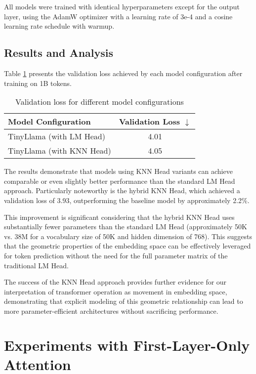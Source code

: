 All models were trained with identical hyperparameters except for the output layer, using the AdamW optimizer with a learning rate of 3e-4 and a cosine learning rate schedule with warmup.

\subsection{Results and Analysis}

Table \ref{tab:knn_head_results} presents the validation loss achieved by each model configuration after training on 1B tokens.

\begin{table}[h]
    \centering
    \caption{Validation loss for different model configurations}
    \begin{tabular}{lc}
    \toprule
    Model Configuration & Validation Loss $\downarrow$ \\
    \midrule
    TinyLlama (with LM Head) & 4.01 \\
    TinyLlama (with KNN Head) & 4.05 \\
    \bottomrule
    \end{tabular}
    \label{tab:knn_head_results}
\end{table}

The results demonstrate that models using KNN Head variants can achieve comparable or even slightly better performance than the standard LM Head approach. Particularly noteworthy is the hybrid KNN Head, which achieved a validation loss of 3.93, outperforming the baseline model by approximately 2.2\%.

This improvement is significant considering that the hybrid KNN Head uses substantially fewer parameters than the standard LM Head (approximately 50K vs. 38M for a vocabulary size of 50K and hidden dimension of 768). This suggests that the geometric properties of the embedding space can be effectively leveraged for token prediction without the need for the full parameter matrix of the traditional LM Head.

The success of the KNN Head approach provides further evidence for our interpretation of transformer operation as movement in embedding space, demonstrating that explicit modeling of this geometric relationship can lead to more parameter-efficient architectures without sacrificing performance.

\section{Experiments with First-Layer-Only Attention}

